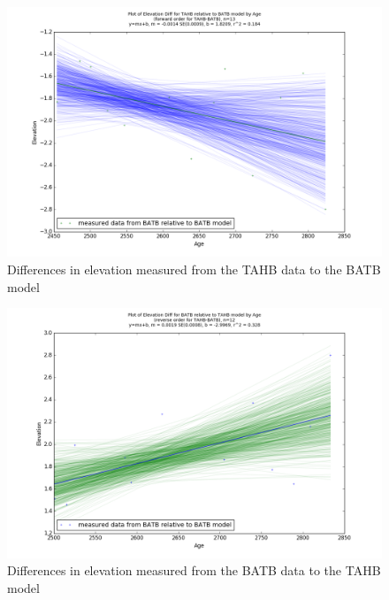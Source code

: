 \begin{figure}[h]
	\includegraphics[width=0.9\linewidth]{data/gias/theGIA_TAHB_relative_to_BATB.png}
	\caption{Differences in elevation measured from the TAHB data to the BATB model}
	\label{fig:gias_TAHBxBATB}
\end{figure}
\newpage


\begin{figure}[h]
	\includegraphics[width=0.9\linewidth]{data/gias/theGIA_BATB_relative_to_TAHB.png}
	\caption{Differences in elevation measured from the BATB data to the TAHB model}
	\label{fig:gias_BATBxTAHB}
\end{figure}
\newpage








